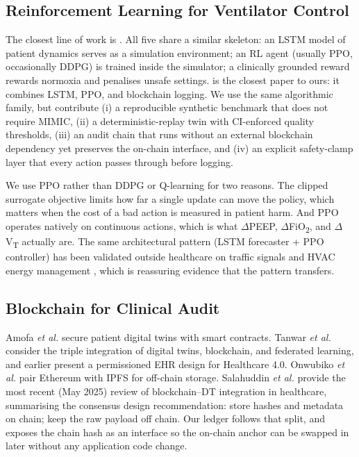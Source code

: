 \documentclass[conference]{IEEEtran}
\begin{document}
\subsection{Reinforcement Learning for Ventilator Control}
The closest line of work is \cite{liu2024rl,sun2024agentmv,access2024_lstm_ppo,access2024_lstm_dt_ppo,access2025_bc_lstm_ppo}. All five share a similar skeleton: an LSTM model of patient dynamics serves as a simulation environment; an RL agent (usually PPO, occasionally DDPG) is trained inside the simulator; a clinically grounded reward rewards normoxia and penalises unsafe settings. \cite{access2025_bc_lstm_ppo} is the closest paper to ours: it combines LSTM, PPO, and blockchain logging. We use the same algorithmic family, but contribute (i) a reproducible synthetic benchmark that does not require MIMIC, (ii) a deterministic-replay twin with CI-enforced quality thresholds, (iii) an audit chain that runs without an external blockchain dependency yet preserves the on-chain interface, and (iv) an explicit safety-clamp layer that every action passes through before logging.

We use PPO \cite{schulman2017ppo} rather than DDPG or Q-learning for two reasons. The clipped surrogate objective limits how far a single update can move the policy, which matters when the cost of a bad action is measured in patient harm. And PPO operates natively on continuous actions, which is what $\Delta$PEEP, $\Delta$FiO\textsubscript{2}, and $\Delta$V\textsubscript{T} actually are. The same architectural pattern (LSTM forecaster + PPO controller) has been validated outside healthcare on traffic signals \cite{faqir2025cnn_lstm_ppo} and HVAC energy management \cite{peng2023hvac_drl}, which is reassuring evidence that the pattern transfers.

\subsection{Blockchain for Clinical Audit}
Amofa \emph{et al.} \cite{amofa2024bcdt} secure patient digital twins with smart contracts. Tanwar \emph{et al.} \cite{tanwar2024bc_dt_fl,tanwar2020bc_ehr} consider the triple integration of digital twins, blockchain, and federated learning, and earlier present a permissioned EHR design for Healthcare 4.0. Onwubiko \emph{et al.} \cite{onwubiko2023ethereum_ipfs} pair Ethereum with IPFS for off-chain storage. Salahuddin \emph{et al.} \cite{salahuddin2025bc_dt_review} provide the most recent (May 2025) review of blockchain--DT integration in healthcare, summarising the consensus design recommendation: store hashes and metadata on chain; keep the raw payload off chain. Our ledger follows that split, and exposes the chain hash as an interface so the on-chain anchor can be swapped in later without any application code change.
\end{document}
